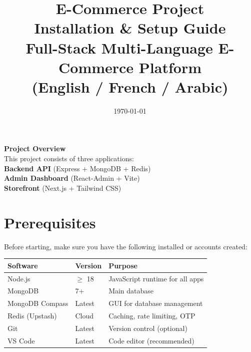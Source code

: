\documentclass[12pt,a4paper]{article}
\title{
    \vspace*{2cm}
    {\Huge\textbf{\textcolor{primarydark}{E-Commerce Project}}}\\[0.3cm]
    {\LARGE\textcolor{primaryblue}{Installation \& Setup Guide}}\\[0.5cm]
    {\large Full-Stack Multi-Language E-Commerce Platform}\\[0.2cm]
    {\large (English / French / Arabic)}\\[1.5cm]
}
\author{}
\date{\large \today}
\begin{document}
\maketitle
\thispagestyle{empty}

\vfill

\begin{center}
    \begin{tcolorbox}[colback=infobox,colframe=primaryblue,width=0.9\textwidth]
        \centering
        \large\textbf{Project Overview}\\[0.3cm]
        This project consists of three applications:\\
        \textbf{Backend API} (Express + MongoDB + Redis)\\
        \textbf{Admin Dashboard} (React-Admin + Vite)\\
        \textbf{Storefront} (Next.js + Tailwind CSS)
    \end{tcolorbox}
\end{center}

\vfill

\newpage

\tableofcontents
\newpage

\section{Prerequisites}

Before starting, make sure you have the following installed or accounts created:

\begin{longtable}{p{3cm} p{4cm} p{7cm}}
    \toprule
    \textbf{Software} & \textbf{Version} & \textbf{Purpose} \\
    \midrule
    Node.js & $\ge$ 18 & JavaScript runtime for all apps \\
    MongoDB & 7+ & Main database \\
    MongoDB Compass & Latest & GUI for database management \\
    Redis (Upstash) & Cloud & Caching, rate limiting, OTP \\
    Git & Latest & Version control (optional) \\
    VS Code & Latest & Code editor (recommended) \\
    \bottomrule
\end{longtable}
\end{document}
